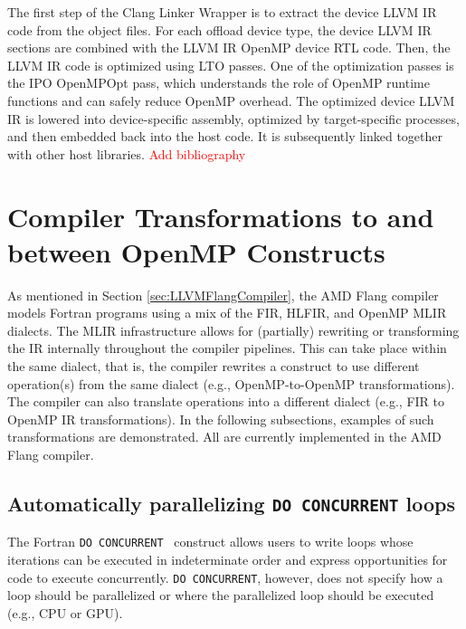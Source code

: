 \documentclass[acmtog,natbib=false]{acmart}
\newcommand{\todo}[1]{\textcolor{red}{#1}}
\newcommand{\code}[1]{\texttt{#1}\xspace}
\begin{document}
The first step of the Clang Linker Wrapper is to extract the device LLVM IR code from the object files.
For each offload device type, the device LLVM \ac{IR} sections are combined with the LLVM \ac{IR} OpenMP device \ac{RTL} code.
Then, the LLVM \ac{IR} code is optimized using \ac{LTO} passes.
One of the optimization passes is the \ac{IPO} OpenMPOpt pass, which understands the role of OpenMP runtime functions and can safely reduce OpenMP overhead.
The optimized device LLVM \ac{IR} is lowered into device-specific assembly, optimized by target-specific processes, and then embedded back into the host code.
It is subsequently linked together with other host libraries.
\todo{Add bibliography}


\section{Compiler Transformations to and between OpenMP Constructs}

As mentioned in Section \ref{sec:LLVMFlangCompiler}, the AMD Flang compiler models Fortran programs using a mix of the \ac{FIR}, \ac{HLFIR}, and OpenMP \ac{MLIR} dialects.
The \ac{MLIR} infrastructure allows for (partially) rewriting or transforming the \ac{IR} internally throughout the compiler pipelines.
This can take place within the same dialect, that is, the compiler rewrites a construct to use different operation(s) from the same dialect (e.g., OpenMP-to-OpenMP transformations).
The compiler can also translate operations into a different dialect (e.g., \ac{FIR} to OpenMP \ac{IR} transformations).
In the following subsections, examples of such transformations are demonstrated.
All are currently implemented in the AMD Flang compiler.

\subsection{Automatically parallelizing \code{DO CONCURRENT} loops}
\label{sec:DCPar}

The Fortran \code{DO CONCURRENT}~\cite{F2023} construct allows users to write loops whose iterations can be executed in indeterminate order and  express opportunities for code to execute concurrently.
\code{DO CONCURRENT}, however, does not specify how a loop should be parallelized or where the parallelized loop should be executed (e.g., CPU or GPU).
\end{document}
